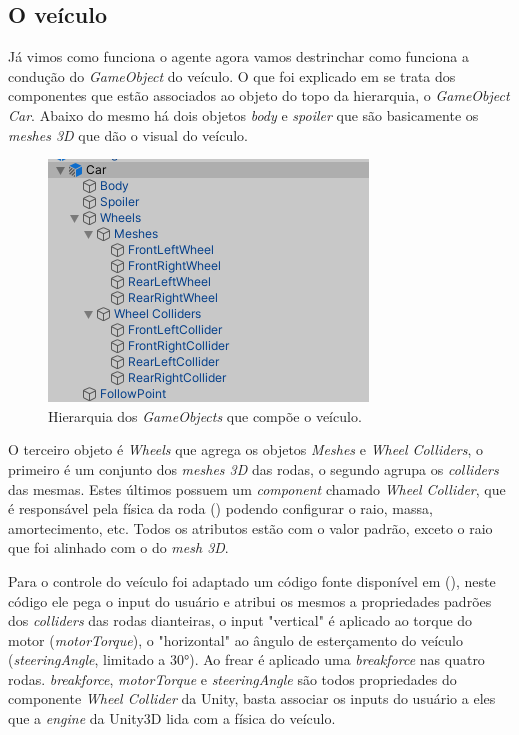 \subsection{O veículo}
Já vimos como funciona o agente agora vamos destrinchar como funciona a condução do \textit{GameObject} do veículo. O que foi explicado em  se trata dos componentes que estão associados ao objeto do topo da hierarquia, o \textit{GameObject Car}. Abaixo do mesmo há dois objetos \textit{body} e \textit{spoiler} que são basicamente os \textit{meshes 3D} que dão o visual do veículo.

\begin{figure}[h]
   \centering
   \includegraphics{figs/hierarquia-veiculo.png}
    \caption{Hierarquia dos \textit{GameObjects} que compõe o veículo.}
    \label{fig:vehicle-hierarchy}
\end{figure}

O terceiro objeto é \textit{Wheels} que agrega os objetos \textit{Meshes} e \textit{Wheel Colliders}, o primeiro é um conjunto dos \textit{meshes 3D} das rodas, o segundo agrupa os \textit{colliders} das mesmas. Estes últimos possuem um \textit{component} chamado \textit{Wheel Collider}, que é responsável pela física da roda () podendo configurar o raio, massa, amortecimento, etc. Todos os atributos estão com o valor padrão, exceto o raio que foi alinhado com o do \textit{mesh 3D}.

Para o controle do veículo foi adaptado um código fonte disponível em (), neste código ele pega o input do usuário e atribui os mesmos a propriedades padrões dos \textit{colliders} das rodas dianteiras, o input "vertical" é aplicado ao torque do motor (\textit{motorTorque}), o "horizontal" ao ângulo de esterçamento do veículo (\textit{steeringAngle}, limitado a 30°). Ao frear é aplicado uma \textit{breakforce} nas quatro rodas. \textit{breakforce}, \textit{motorTorque} e \textit{steeringAngle} são todos propriedades do componente \textit{Wheel Collider} da Unity, basta associar os inputs do usuário a eles que a \textit{engine} da Unity3D lida com a física do veículo.

